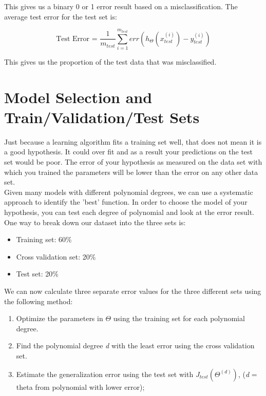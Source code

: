 This gives us a binary 0 or 1 error result based on a misclassification. The average test error for the test set is:

\begin{center}
$$\mbox{Test Error = } \frac{1}{m_{test}}\sum_{i=1}^{m_{test}}err(h_\Theta(x^{(i)}_{test})-y^{(i)}_{test})$$
\end{center}

This gives us the proportion of the test data that was misclassified.


\section{Model Selection and Train/Validation/Test Sets}

Just because a learning algorithm fits a training set well, that does not mean it is a good hypothesis. It could over fit and as a result your predictions on the test set would be poor. The error of your hypothesis as measured on the data set with which you trained the parameters will be lower than the error on any other data set.\\

Given many models with different polynomial degrees, we can use a systematic approach to identify the 'best' function. In order to choose the model of your hypothesis, you can test each degree of polynomial and look at the error result.\\

One way to break down our dataset into the three sets is:

\begin{itemize}
\item Training set: 60\%
\item Cross validation set: 20\%
\item Test set: 20\%
\end{itemize}

We can now calculate three separate error values for the three different sets using the following method:

\begin{enumerate}
\item Optimize the parameters in $\Theta$ using the training set for each polynomial degree.
\item Find the polynomial degree \textit{d} with the least error using the cross validation set.
\item Estimate the generalization error using the test set with $ J_{test}(\Theta^{(d)}) $, (\textit{d }= theta from polynomial with lower error);
\end{enumerate}

